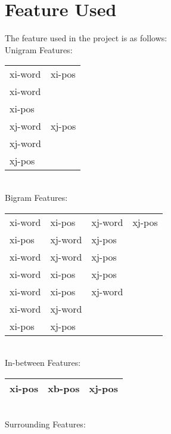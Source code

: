 \documentclass[11pt]{article}
\begin{document}
\section{Feature Used}

The feature used in the project is as follows: \\


Unigram Features: \\

\begin{tabular}{|l l|}
	\hline
		xi-word& xi-pos \\
		xi-word& \\
		xi-pos & \\
		xj-word& xj-pos \\
		xj-word& \\
		xj-pos& \\
	\hline
\end{tabular} \\




Bigram Features: \\

\begin{tabular}{|l l l l| }
	\hline
		xi-word& xi-pos& xj-word& xj-pos \\
		xi-pos& xj-word& xj-pos & \\
		xi-word& xj-word& xj-pos & \\
		xi-word& xi-pos& xj-pos &\\
		xi-word& xi-pos& xj-word& \\
		xi-word& xj-word & &\\
		xi-pos& xj-pos  & &\\
	\hline
\end{tabular} \\



In-between Features: \\

\begin{tabular}{|l l l|}
	\hline
		xi-pos& xb-pos& xj-pos \\
	\hline
\end{tabular} \\



Surrounding Features: \\
\end{document}
